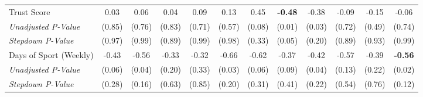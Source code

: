\begin{tabular}{l c c c c c c c c c c c}
Trust Score & 0.03 & 0.06 & 0.04 & 0.09 & 0.13 & 0.45 & \textbf{ -0.48 } & -0.38 & -0.09 & -0.15 & -0.06 \\
\quad \textit{Unadjusted P-Value} & (0.85) & (0.76) & (0.83) & (0.71) & (0.57) & (0.08) & (0.01) & (0.03) & (0.72) & (0.49) & (0.74) \\
\quad \textit{Stepdown P-Value} & (0.97) & (0.99) & (0.89) & (0.99) & (0.98) & (0.33) & (0.05) & (0.20) & (0.89) & (0.93) & (0.99) \\
Days of Sport (Weekly) & -0.43 & -0.56 & -0.33 & -0.32 & -0.66 & -0.62 & -0.37 & -0.42 & -0.57 & -0.39 & \textbf{ -0.56 } \\
\quad \textit{Unadjusted P-Value} & (0.06) & (0.04) & (0.20) & (0.33) & (0.03) & (0.06) & (0.09) & (0.04) & (0.13) & (0.22) & (0.02) \\
\quad \textit{Stepdown P-Value} & (0.28) & (0.16) & (0.63) & (0.85) & (0.20) & (0.31) & (0.41) & (0.22) & (0.54) & (0.76) & (0.12) \\
\bottomrule
\end{tabular}
